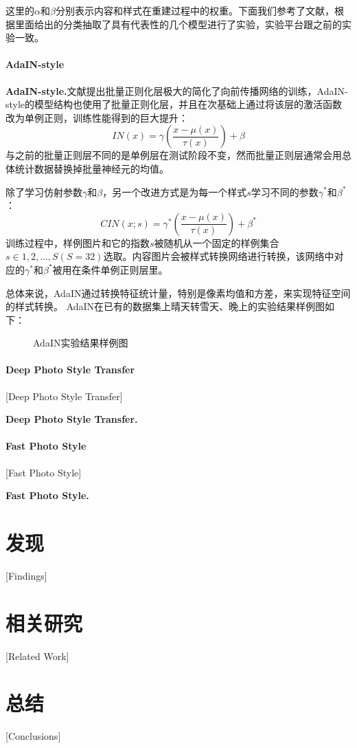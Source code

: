 这里的$\alpha$和$\beta$分别表示内容和样式在重建过程中的权重。下面我们参考了文献\cite{nst-survey}，根据里面给出的分类抽取了具有代表性的几个模型进行了实验，实验平台跟之前的实验一致。

\subsubsection[AdaIN-style]{AdaIN-style}

\textbf{AdaIN-style.}\cite{adain}\quad 文献\cite{ioffe}提出批量正则化层极大的简化了向前传播网络的训练，AdaIN-style的模型结构也使用了批量正则化层，并且在次基础上通过将该层的激活函数改为单例正则，训练性能得到的巨大提升：
$$ IN(x)=\gamma(\frac{x-\mu(x)}{\tau(x)})+\beta$$
与之前的批量正则层不同的是单例层在测试阶段不变，然而批量正则层通常会用总体统计数据替换掉批量神经元的均值。

除了学习仿射参数$\gamma$和$\beta$，另一个改进方式是为每一个样式$s$学习不同的参数$\gamma^*$和$\beta^*$：
$$CIN(x;s)=\gamma^*(\frac{x-\mu(x)}{\tau(x)})+\beta^*$$
训练过程中，样例图片和它的指数$s$被随机从一个固定的样例集合$s\in {1,2,\dots,S}(S=32)$选取。内容图片会被样式转换网络进行转换，该网络中对应的$\gamma^*$和$\beta^*$被用在条件单例正则层里。

总体来说，AdaIN通过转换特征统计量，特别是像素均值和方差，来实现特征空间的样式转换。
AdaIN在已有的数据集上晴天转雪天、晚上的实验结果样例图如下：
\begin{figure}[h]
    \centering
    \caption{AdaIN实验结果样例图}
\end{figure}


\subsubsection{Deep Photo Style Transfer}[Deep Photo Style Transfer]

\textbf{Deep Photo Style Transfer.}\cite{dpst}\quad  

\subsubsection{Fast Photo Style}[Fast Photo Style]

\textbf{Fast Photo Style.}\cite{fps}\quad  

\chapter{发现}[Findings]

\chapter{相关研究}[Related Work]

\chapter{总结}[Conclusions]